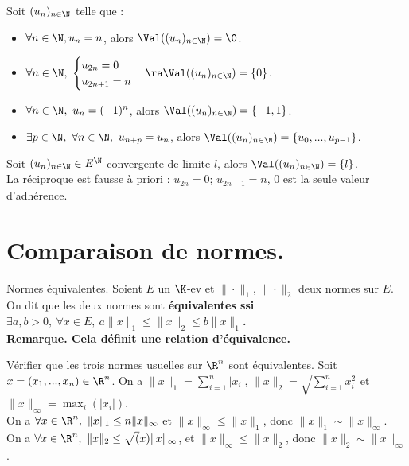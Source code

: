 \documentclass[11pt]{article}
\begin{document}
\vspace*{-0.7cm}

\begin{ex}{}{}
    Soit $(u_n)_{n\in\N}$ telle que :
    \begin{itemize}
        \item $\forall n \in \N, u_n = n$, alors $\Val((u_n)_{n\in\N})=\0$.
        \item $\forall n \in \N, ~ \begin{cases} u_{2n} = 0 \\ u_{2n+1} = n \end{cases} \ra \Val((u_n)_{n\in\N}) = \{0\}$.
        \item $\forall n \in \N, ~ u_n=(-1)^n$, alors $\Val((u_n)_{n\in\N})=\{-1,1\}$.
        \item $\exists p \in \N, ~ \forall n \in \N, ~ u_{n+p}=u_n$, alors $\Val((u_n)_{n\in\N})=\{u_0,...,u_{p-1}\}$.
    \end{itemize}
\end{ex}

\vspace*{-0.7cm}

\begin{prop}{}{}
    Soit $(u_n)_{n\in\N}\in E^\N$ convergente de limite $l$, alors $\Val((u_n)_{n\in\N})=\{l\}$.\\
    La réciproque est fausse à priori : $u_{2n}=0$; $u_{2n+1}=n$, $0$ est la seule valeur d'adhérence.
\end{prop}

\vspace*{-0.7cm}

\section{Comparaison de normes.}

\begin{defi}{Normes équivalentes.}{}
    Soient $E$ un $\K$-ev et $\|\cdot\|_1$, $\|\cdot\|_2$ deux normes sur $E$.\\
    On dit que les deux normes sont \bf{équivalentes} ssi $\exists a,b > 0, ~ \forall x \in E, ~ a\|x\|_1\leq\|x\|_2\leq b\|x\|_1$.\\
    \bf{Remarque.} Cela définit une relation d'équivalence.
\end{defi}

\vspace*{-0.7cm}

\begin{ex}{}{}
    Vérifier que les trois normes usuelles sur $\R^n$ sont équivalentes.
    \tcblower
    Soit $x=(x_1,...,x_n)\in\R^n$. On a $\|x\|_1=\sum_{i=1}^n|x_i|$, $\|x\|_2=\sqrt{\sum_{i=1}^nx_i^2}$ et $\|x\|_{\infty}=\max_i(|x_i|)$.\\
    On a $\forall x \in \R^n, ~ \|x\|_1\leq n\|x\|_\infty$ et $\|x\|_\infty \leq \|x\|_1$, donc $\|x\|_1\sim \|x\|_\infty$.\\
    On a $\forall x \in \R^n, ~ \|x\|_2\leq \sqrt(x)\|x\|_{\infty}$, et $\|x\|_{\infty}\leq\|x\|_2$, donc $\|x\|_2\sim \|x\|_\infty$. 
\end{ex}
\end{document}
